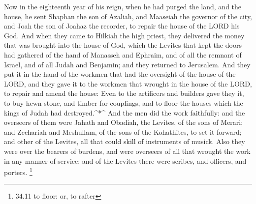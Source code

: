  Now in the eighteenth year of his reign, when he had purged
the land, and the house, he sent Shaphan the son of Azaliah, and
Maaseiah the governor of the city, and Joah the son of Joahaz the
recorder, to repair the house of the LORD his God.  And when
they came to Hilkiah the high priest, they delivered the money that was
brought into the house of God, which the Levites that kept the doors had
gathered of the hand of Manasseh and Ephraim, and of all the remnant of
Israel, and of all Judah and Benjamin; and they returned to Jerusalem.
 And they put it in the hand of the workmen that had the
oversight of the house of the LORD, and they gave it to the workmen that
wrought in the house of the LORD, to repair and amend the house:
 Even to the artificers and builders gave they it, to buy
hewn stone, and timber for couplings, and to floor the houses which the
kings of Judah had destroyed.\^{}*\^{}  And the men did the
work faithfully: and the overseers of them were Jahath and Obadiah, the
Levites, of the sons of Merari; and Zechariah and Meshullam, of the sons
of the Kohathites, to set it forward; and other of the Levites, all that
could skill of instruments of musick.  Also they were over
the bearers of burdens, and were overseers of all that wrought the work
in any manner of service: and of the Levites there were scribes, and
officers, and porters. \footnote{34.11 to floor: or, to rafter}

